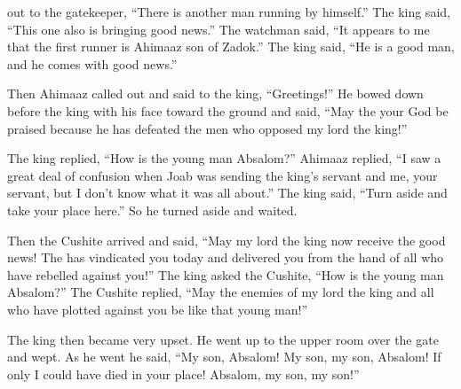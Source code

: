 {out to
the gatekeeper,
“There
is another man
running
by himself.”
The king
said,
“This
one also
is bringing good news.”
The watchman
said,
“It appears
to me that the first
runner
is Ahimaaz
son
of Zadok.”
The king
said,
“He is a good
man,
and he comes
with good
news.”
\par }{\PP {}Then Ahimaaz
called
out and said
to
the king,
“Greetings!” He bowed
down before the king
with his face
toward the ground
and said,
“May the
{}
your God
be praised
because
he has defeated
the
men
who
opposed
my lord
the king!”
\par }{\PP {}The king
replied,
“How
is the young man
Absalom?” Ahimaaz
replied,
“I saw
a great
deal of confusion
when
Joab
was sending
the king’s
servant
and me, your servant,
but I don’t know
what it was all about.”
The king
said,
“Turn
aside
and take
your place here.”
So he turned
aside and waited.
\par }{\PP {}Then
the Cushite
arrived
and said, “May
my lord
the king
now receive the good news! The
{}
has vindicated
you today
and delivered you from the hand
of all
who have
rebelled
against you!”
The king
asked
the Cushite,
“How
is the young man
Absalom?” The Cushite
replied,
“May the enemies
of my lord
the king
and all
who have
plotted
against you be
like that young man!”
\par }{\PP {}The king
then became very upset.
He went up
to the upper
room over the gate
and wept.
As he went
he said,
“My son,
Absalom! My son,
my son,
Absalom! If only
I
could have died
in your place! Absalom,
my son,
my son!”

}
